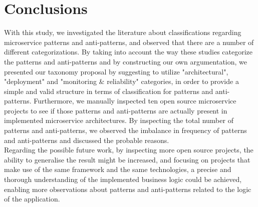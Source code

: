 \documentclass[11pt,a4paper,twocolumn]{article}
\begin{document}
\section{Conclusions}

With this study, we investigated the literature about classifications regarding microservice patterns and anti-patterns, and observed that there are a number of different categorizations.
By taking into account the way these studies categorize the patterns and anti-patterns and by constructing our own argumentation, we presented our taxonomy proposal by suggesting to utilize "architectural", "deployment" and "monitoring \& reliability" categories, in order to provide a simple and valid structure in terms of classification for patterns and anti-patterns.
Furthermore, we manually inspected ten open source microservice projects to see if those patterns and anti-patterns are actually present in implemented microservice architectures.
By inspecting the total number of patterns and anti-patterns, we observed the imbalance in frequency of patterns and anti-patterns and discussed the probable reasons.
\\
Regarding the possible future work, by inspecting more open source projects, the ability to generalise the result might be increased, and focusing on projects that make use of the same framework and the same technologies, a precise and thorough understanding of the implemented business logic could be achieved, enabling more observations about patterns and anti-patterns related to the logic of the application.

\end{document}
